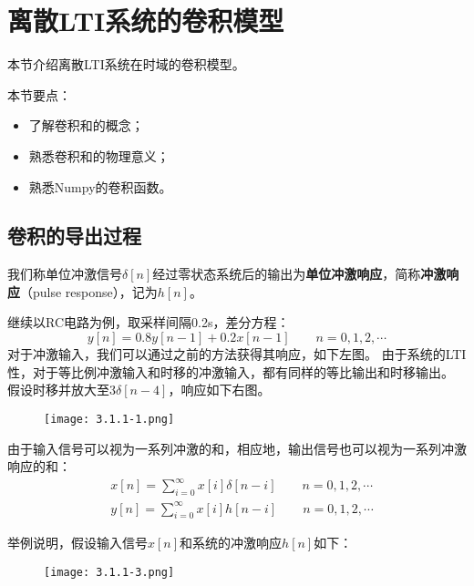 \section{离散LTI系统的卷积模型}

本节介绍离散LTI系统在时域的卷积模型。

本节要点：
\begin{itemize}
    \item 了解卷积和的概念；
    \item 熟悉卷积和的物理意义；
    \item 熟悉Numpy的卷积函数。
\end{itemize}

\subsection{卷积的导出过程}

\begin{definition}[冲激响应]
我们称单位冲激信号$\delta \left[ n \right] $经过零状态系统后的输出为{\bf 单位冲激响应}，简称{\bf 冲激响应}（pulse response），记为$h\left[ n \right] $。
\end{definition}

继续以RC电路为例，取采样间隔0.2s，差分方程：
\[
y\left[ n \right] =0.8y\left[ n-1 \right] +0.2x\left[ n-1 \right] \qquad n=0,1,2,\cdots
\]
对于冲激输入，我们可以通过之前的方法获得其响应，如下左图。
由于系统的LTI性，对于等比例冲激输入和时移的冲激输入，都有同样的等比输出和时移输出。
假设时移并放大至$3\delta \left[ n-4 \right] $，响应如下右图。
\begin{figure}[h]
\centering
\texttt{[image: 3.1.1-1.png]}
\end{figure}

由于输入信号可以视为一系列冲激的和，相应地，输出信号也可以视为一系列冲激响应的和：
\begin{align*}
&x\left[ n \right] =\sum_{i=0}^{\infty}{x\left[ i \right] \delta \left[ n-i \right]} \qquad n=0,1,2,\cdots \\
&y\left[ n \right] =\sum_{i=0}^{\infty}{x\left[ i \right] h\left[ n-i \right]} \qquad n=0,1,2,\cdots
\end{align*}

举例说明，假设输入信号$x\left[ n \right] $和系统的冲激响应$h\left[ n \right] $如下：
\begin{figure}[ht]
\centering
\texttt{[image: 3.1.1-3.png]}
\end{figure}

